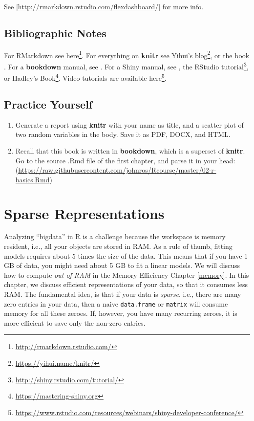 \documentclass[]{book}
\renewcommand{\href}[2]{#2\footnote{\url{#1}}}
\theoremstyle{definition}
\theoremstyle{definition}
\theoremstyle{definition}
\theoremstyle{remark}
\begin{document}
See {[}\url{http://rmarkdown.rstudio.com/flexdashboard/}{]} for more info.

\hypertarget{bibliographic-notes-11}{%
\section{Bibliographic Notes}\label{bibliographic-notes-11}}

For RMarkdown see \href{http://rmarkdown.rstudio.com/}{here}.
For everything on \textbf{knitr} see \href{https://yihui.name/knitr/}{Yihui's blog}, or the book \citet{xie2015dynamic}.
For a \textbf{bookdown} manual, see \citet{xie2016bookdown}.
For a Shiny manual, see \citet{shiny}, the \href{http://shiny.rstudio.com/tutorial/}{RStudio tutorial}, or \href{https://mastering-shiny.org}{Hadley's Book}.
Video tutorials are available \href{https://www.rstudio.com/resources/webinars/shiny-developer-conference/}{here}.

\hypertarget{practice-yourself-9}{%
\section{Practice Yourself}\label{practice-yourself-9}}

\begin{enumerate}
\def\labelenumi{\arabic{enumi}.}
\item
  Generate a report using \textbf{knitr} with your name as title, and a scatter plot of two random variables in the body. Save it as PDF, DOCX, and HTML.
\item
  Recall that this book is written in \textbf{bookdown}, which is a superset of \textbf{knitr}. Go to the source .Rmd file of the first chapter, and parse it in your head:
  (\url{https://raw.githubusercontent.com/johnros/Rcourse/master/02-r-basics.Rmd})
\end{enumerate}

\hypertarget{sparse}{%
\chapter{Sparse Representations}\label{sparse}}

Analyzing ``bigdata'' in R is a challenge because the workspace is memory resident, i.e., all your objects are stored in RAM.
As a rule of thumb, fitting models requires about 5 times the size of the data.
This means that if you have 1 GB of data, you might need about 5 GB to fit a linear models.
We will discuss how to compute \emph{out of RAM} in the Memory Efficiency Chapter \ref{memory}.
In this chapter, we discuss efficient representations of your data, so that it consumes less RAM.
The fundamental idea, is that if your data is \emph{sparse}, i.e., there are many zero entries in your data, then a naive \texttt{data.frame} or \texttt{matrix} will consume memory for all these zeroes.
If, however, you have many recurring zeroes, it is more efficient to save only the non-zero entries.
\end{document}
